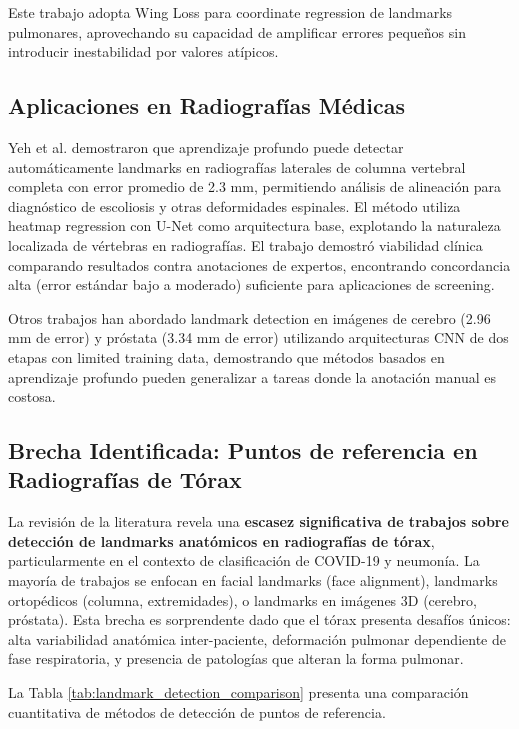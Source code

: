 Este trabajo adopta Wing Loss para coordinate regression de landmarks pulmonares, aprovechando su capacidad de amplificar errores pequeños sin introducir inestabilidad por valores atípicos.

\subsection{Aplicaciones en Radiografías Médicas}

Yeh et al. \cite{yeh2021deep} demostraron que aprendizaje profundo puede detectar automáticamente landmarks en radiografías laterales de columna vertebral completa con error promedio de 2.3 mm, permitiendo análisis de alineación para diagnóstico de escoliosis y otras deformidades espinales. El método utiliza heatmap regression con U-Net como arquitectura base, explotando la naturaleza localizada de vértebras en radiografías. El trabajo demostró viabilidad clínica comparando resultados contra anotaciones de expertos, encontrando concordancia alta (error estándar bajo a moderado) suficiente para aplicaciones de screening.

Otros trabajos han abordado landmark detection en imágenes de cerebro (2.96 mm de error) y próstata (3.34 mm de error) utilizando arquitecturas CNN de dos etapas con limited training data, demostrando que métodos basados en aprendizaje profundo pueden generalizar a tareas donde la anotación manual es costosa.

\subsection{Brecha Identificada: Puntos de referencia en Radiografías de Tórax}

La revisión de la literatura revela una \textbf{escasez significativa de trabajos sobre detección de landmarks anatómicos en radiografías de tórax}, particularmente en el contexto de clasificación de COVID-19 y neumonía. La mayoría de trabajos se enfocan en facial landmarks (face alignment), landmarks ortopédicos (columna, extremidades), o landmarks en imágenes 3D (cerebro, próstata). Esta brecha es sorprendente dado que el tórax presenta desafíos únicos: alta variabilidad anatómica inter-paciente, deformación pulmonar dependiente de fase respiratoria, y presencia de patologías que alteran la forma pulmonar.

La Tabla \ref{tab:landmark_detection_comparison} presenta una comparación cuantitativa de métodos de detección de puntos de referencia.


